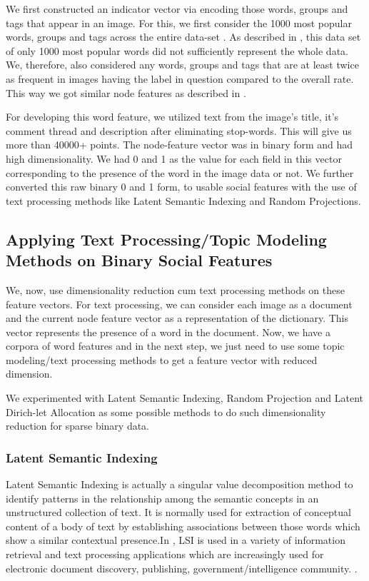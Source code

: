 We first constructed an indicator vector via encoding those words, groups and 
tags that appear in an image. For this, we first consider the 1000 
most popular words, groups and tags across the entire data-set . As 
described in , this data set of only 1000 most popular 
words did not sufficiently represent the whole data. We, therefore, 
also considered any words, groups and tags that are at least twice as 
frequent in images having the label in question compared to the 
overall rate. This way we got similar node features as described in \citet*{Jure}. 

For developing this word feature, we utilized text from the image's 
title, it's comment thread and description after eliminating stop-words.
This will give us more than 40000+ points. The node-feature vector 
was in binary form and had high dimensionality. We had 0 and 1 as the 
value for each field in this vector corresponding to the presence of the 
word in the image data or not. We further converted this raw binary 0 
and 1 form, to usable social features with the use of text 
processing methods like Latent Semantic Indexing and Random 
Projections.

\subsection{Applying Text Processing/Topic Modeling Methods on 
Binary Social Features}
We, now, use dimensionality reduction cum text processing methods 
on these feature vectors. For text processing, we can consider 
each image as a document and the current node feature vector as a 
representation of the dictionary. This vector represents the presence of 
a word in the document. Now, we have a corpora of word features and in 
the next step, we just need to use some topic modeling/text processing 
methods to get a feature vector with reduced dimension.

We experimented with Latent Semantic Indexing, Random Projection and 
Latent Dirich-let Allocation as some possible methods to do such 
dimensionality reduction for sparse binary data.
\subsubsection{Latent Semantic Indexing}
Latent Semantic Indexing is actually a singular value decomposition 
method to identify patterns in the relationship among the semantic 
concepts in an unstructured collection of text. It is normally used 
for extraction of conceptual content of a body of text by 
establishing associations between those words which show a 
similar contextual presence.In \citet*{Deerwester}, 
LSI is used in a variety of information retrieval and text 
processing applications which are increasingly used for electronic 
document discovery, publishing, government/intelligence community. 
\citet*{e-discovery}.


